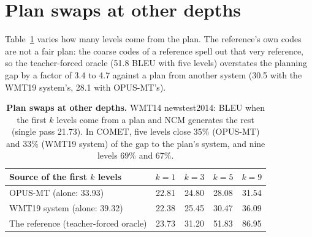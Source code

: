 \documentclass[11pt]{article}
\begin{document}
\section{Plan swaps at other depths}
\label{app:plans}

Table~\ref{tab:depth} varies how many levels come from the plan. The
reference's own codes are not a fair plan: the coarse codes of a reference spell out that very reference, so the
teacher-forced oracle (51.8 BLEU with five levels) overstates the planning gap by a factor of 3.4 to 4.7 against a
plan from another system (30.5 with the WMT19 system's, 28.1 with OPUS-MT's).

\begin{table}[H]
\centering
\small
\renewcommand{\arraystretch}{1.12}
\begin{tabular*}{\linewidth}{@{\extracolsep{\fill}}lcccc@{}}
\toprule
Source of the first $k$ levels & $k=1$ & $k=3$ & $k=5$ & $k=9$ \\
\midrule
OPUS-MT (alone: 33.93) & 22.81 & 24.80 & 28.08 & 31.54 \\
WMT19 system (alone: 39.32) & 22.38 & 25.45 & 30.47 & 36.09 \\
The reference (teacher-forced oracle) & 23.73 & 31.20 & 51.83 & 86.95 \\
\bottomrule
\end{tabular*}
\caption{\textbf{Plan swaps at other depths.} WMT14 newstest2014: BLEU when the first $k$ levels come from a plan and NCM generates the rest (single pass
21.73). In COMET, five levels close 35\% (OPUS-MT) and 33\% (WMT19 system) of the gap to the plan's system, and nine
levels 69\% and 67\%.}
\label{tab:depth}
\end{table}
\end{document}
